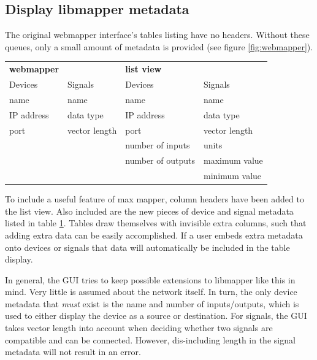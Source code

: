 	
	\subsection{Display libmapper metadata} %
	\label{sub:display_libmapper_metadata}

The original webmapper interface's tables listing have no headers. Without these queues, only a small amount of metadata is provided (see figure \ref{fig:webmapper}).

\begin{table}
	\centering
	\label{tab:webmapper_list_view_metadata}
		\begin{tabular}{l  l  |  l l }
		\hline\hline
		\textbf{webmapper}&&\textbf{list view}\\
		Devices&Signals&Devices&Signals\\
		\hline
		name&name&name&name\\
		IP address&data type&IP address&data type\\
		port&vector length&port&vector length\\
		&&number of inputs&units\\
		&&number of outputs&maximum value\\
		&&&minimum value\\
		\end{tabular}
\end{table}

To include a useful feature of max mapper, column headers have been added to the list view. Also included are the new pieces of device and signal metadata listed in table \ref{tab:webmapper_list_view_metadata}. Tables draw themselves with invisible extra columns, such that adding extra data can be easily accomplished. If a user embeds extra metadata onto devices or signals that data will automatically be included in the table display.  

In general, the GUI tries to keep possible extensions to libmapper like this in mind. Very little is assumed about the network itself. In turn, the only device metadata that \emph{must} exist is the name and number of inputs/outputs, which is used to either display the device as a source or destination. For signals, the GUI takes vector length into account when deciding whether two signals are compatible and can be connected. However, dis-including length in the signal metadata will not result in an error.
	
